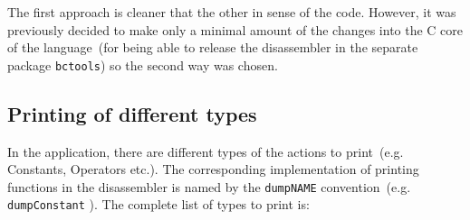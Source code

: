 \documentclass[thesis=M,english]{FITthesis}[2018/10/20]
\newcommand{\code}[1]{\texttt{#1}}
\begin{document}
The first approach is cleaner that the other in sense of the code. However, it was previously decided to make only a minimal amount of the changes into the C core of the language~(for being able to release the disassembler in the separate package \code{bctools}) so the second way was chosen.


\subsection{Printing of different types}\label{printing-of-different-types}

In the application, there are different types of the actions to print~(e.g. Constants, Operators etc.). The corresponding implementation of printing functions in the disassembler is named by the \code{dumpNAME} convention~(e.g. \code{dumpConstant} ). The complete list of types to print is:
\end{document}
